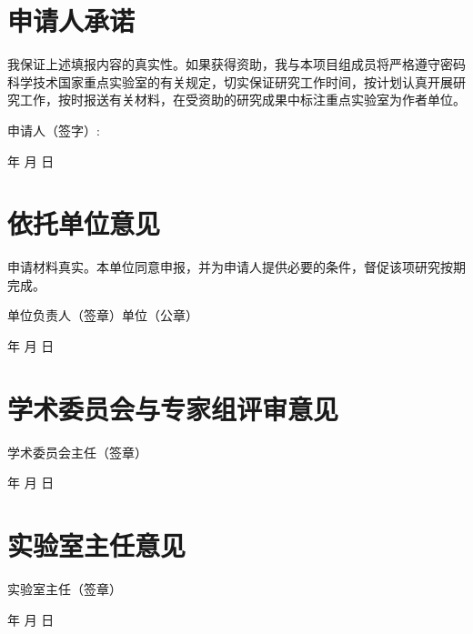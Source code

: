 \documentclass{sklcApplicant}
\begin{document}
\section{申请人承诺}
\begin{framed}
我保证上述填报内容的真实性。如果获得资助，我与本项目组成员将严格遵守密码科学技术国家重点实验室的有关规定，切实保证研究工作时间，按计划认真开展研究工作，按时报送有关材料，在受资助的研究成果中标注重点实验室为作者单位。

\begin{flushright}
	申请人（签字）: 	\qquad\qquad\qquad\qquad\qquad\qquad
\end{flushright}
\begin{flushright}
	年 \qquad 月 \qquad 日
	\end{flushright}
\end{framed}
\newpage
\section{依托单位意见}
\begin{framed}
申请材料真实。本单位同意申报，并为申请人提供必要的条件，督促该项研究按期完成。
\vspace{1cm}
	\begin{flushright}
单位负责人（签章）\qquad\qquad\qquad\qquad\qquad 单位（公章）\qquad\qquad\qquad\qquad\qquad\qquad\qquad
	\end{flushright}
\vspace{1cm}
	\begin{flushright}
		年 \qquad 月 \qquad 日
	\end{flushright}
\end{framed}


\section{学术委员会与专家组评审意见}
\begin{framed}
	\vspace{2cm}
	\begin{flushright}
		学术委员会主任（签章）\qquad\qquad\qquad\qquad\qquad\qquad\qquad
	\end{flushright}
	\begin{flushright}
		年 \qquad 月 \qquad 日
	\end{flushright}
\end{framed}




\section{实验室主任意见}
\begin{framed}
	\vspace{1.5cm}
	\begin{flushright}
		{\heiti 实验室主任（签章）}\qquad\qquad\qquad\qquad\qquad\qquad\qquad
	\end{flushright}
	\begin{flushright}
		年 \qquad 月 \qquad 日
	\end{flushright}
\end{framed}
\end{document}
